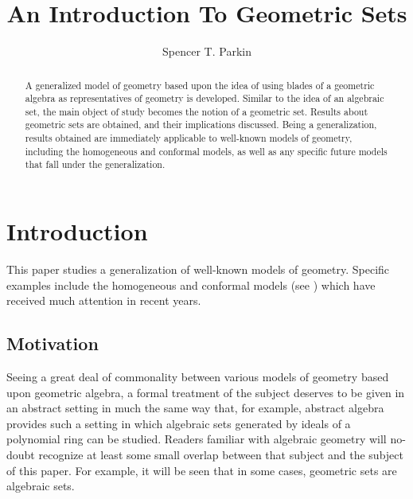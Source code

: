 \documentclass{birkjour}
\theoremstyle{definition}
\theoremstyle{remark}
\numberwithin{equation}{section}
\begin{document}
\title{An Introduction To Geometric Sets}

\author{Spencer T. Parkin}
\address{102 W. 500 S., \\
Salt Lake City, UT  84101} 



\begin{abstract}
A generalized model of geometry based upon the idea of using blades of a geometric algebra
as representatives of geometry is developed.  Similar to the idea of an algebraic set, the main object of study
becomes the notion of a geometric set.  Results about geometric sets are obtained, and their implications discussed.
Being a generalization, results obtained are immediately applicable to well-known models of geometry,
including the homogeneous and conformal models, as well as any specific future models that fall
under the generalization.
\end{abstract}


\maketitle

\section{Introduction}

This paper studies a generalization of well-known models of geometry.
Specific examples include the homogeneous and conformal models (see \cite{Dorst07,Hestenes01,Lasenby04})
which have received much attention in recent years.

\subsection{Motivation}

Seeing a great deal of commonality between various models of geometry based upon
geometric algebra, a formal treatment of the subject deserves to be given in an abstract
setting in much the same way that, for example, abstract algebra provides such a setting
in which algebraic sets generated by ideals of a polynomial ring can be studied.
Readers familiar with algebraic geometry will no-doubt recognize at least some small overlap
between that subject and the subject of this paper.  For example, it will be seen
that in some cases, geometric sets are algebraic sets.
\end{document}
